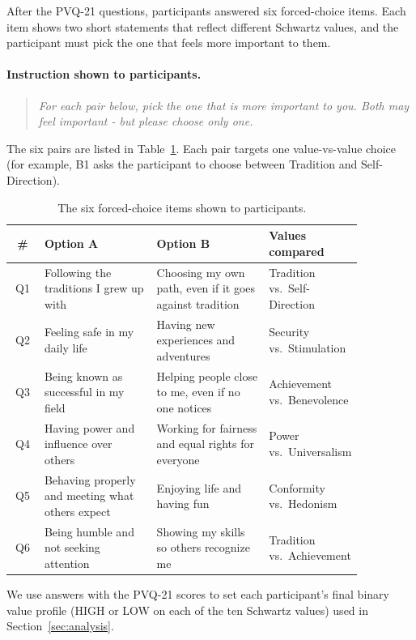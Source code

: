 \documentclass[11pt]{article}
\begin{document}
After the PVQ-21 questions, participants answered six forced-choice items. Each item shows two short statements that reflect different Schwartz values, and the participant must pick the one that feels more important to them.

\paragraph{Instruction shown to participants.}
\begin{quote}\itshape
For each pair below, pick the one that is more important to you. Both may feel important - but please choose only one.
\end{quote}

The six pairs are listed in Table~\ref{tab:block_b}. Each pair targets one value-vs-value choice (for example, B1 asks the participant to choose between Tradition and Self-Direction).

\begin{table}[t]
\centering\footnotesize
\setlength{\tabcolsep}{4pt}
\renewcommand{\arraystretch}{1.2}
\begin{tabular}{@{}c p{0.32\linewidth} p{0.32\linewidth} p{0.22\linewidth}@{}}
\toprule
\textbf{\#} & \textbf{Option A} & \textbf{Option B} & \textbf{Values compared} \\
\midrule
Q1 & Following the traditions I grew up with & Choosing my own path, even if it goes against tradition & Tradition vs.\ Self-Direction \\
Q2 & Feeling safe in my daily life & Having new experiences and adventures & Security vs.\ Stimulation \\
Q3 & Being known as successful in my field & Helping people close to me, even if no one notices & Achievement vs.\ Benevolence \\
Q4 & Having power and influence over others & Working for fairness and equal rights for everyone & Power vs.\ Universalism \\
Q5 & Behaving properly and meeting what others expect & Enjoying life and having fun & Conformity vs.\ Hedonism \\
Q6 & Being humble and not seeking attention & Showing my skills so others recognize me & Tradition vs.\ Achievement \\
\bottomrule
\end{tabular}
\caption{The six forced-choice items shown to participants.}
\label{tab:block_b}
\end{table}

We use answers with the PVQ-21 scores to set each participant's final binary value profile (HIGH or LOW on each of the ten Schwartz values) used in Section~\ref{sec:analysis}.
\end{document}
